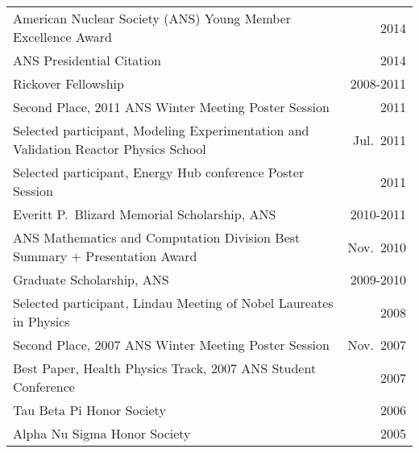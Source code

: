 \begin{tabular}{ @{} l @{\hspace{6ex}} r }
American Nuclear Society (ANS) Young Member Excellence Award & 2014 \\
ANS Presidential Citation & 2014 \\
Rickover Fellowship 	& 2008-2011 \\
Second Place, 2011 ANS Winter Meeting Poster Session	&2011\\
Selected participant, Modeling Experimentation and Validation Reactor Physics School	& Jul.\ 2011\\
Selected participant, Energy Hub conference Poster Session	&2011\\
Everitt P.\ Blizard Memorial Scholarship, ANS	&2010-2011\\
ANS Mathematics and Computation Division Best Summary + Presentation Award  &Nov.\ 2010\\
Graduate Scholarship, ANS 	&2009-2010\\
Selected participant, Lindau Meeting of Nobel Laureates in Physics &	2008\\
Second Place, 2007 ANS Winter Meeting Poster Session	&Nov.\ 2007\\
Best Paper, Health Physics Track, 2007 ANS Student Conference 	&2007\\
Tau Beta Pi Honor Society	&2006\\
Alpha Nu Sigma Honor Society 	&2005 \\
\end{tabular}
